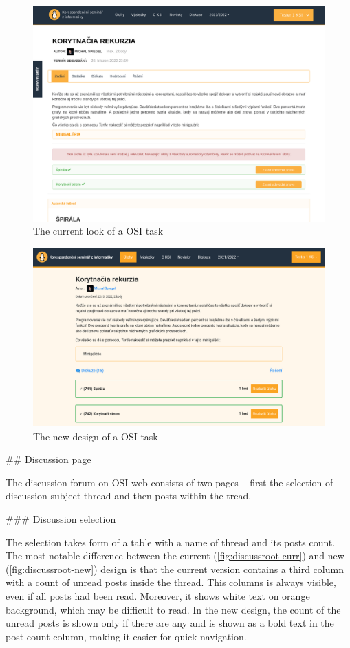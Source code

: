 \documentclass[
  digital, %
  oneside, %
  lof,     %
  lot,     %
]{fithesis4}
\begin{document}
{\begin{figure}
\includegraphics[width=.9\textwidth]{assets/img/task-curr}
\caption{The current look of a OSI task}
\label{fig:task-curr}
\end{figure}

\begin{figure}
\includegraphics[width=\textwidth]{assets/img/task-new}
\caption{The new design of a OSI task}
\label{fig:task-new}
\end{figure}


## Discussion page

The discussion forum on OSI web consists of two pages -- first the selection of discussion subject thread and then posts within the tread.

### Discussion selection

The selection takes form of a table with a name of thread and its posts count. The most notable difference between the current (\ref{fig:discussroot-curr}) and new (\ref{fig:discussroot-new}) design is that the current version contains a third column with a count of unread posts inside the thread. This columns is always visible, even if all posts had been read. Moreover, it shows white text on orange background, which may be difficult to read. In the new design, the count of the unread posts is shown only if there are any and is shown as a bold text in the post count column, making it easier for quick navigation.

}
\end{document}

